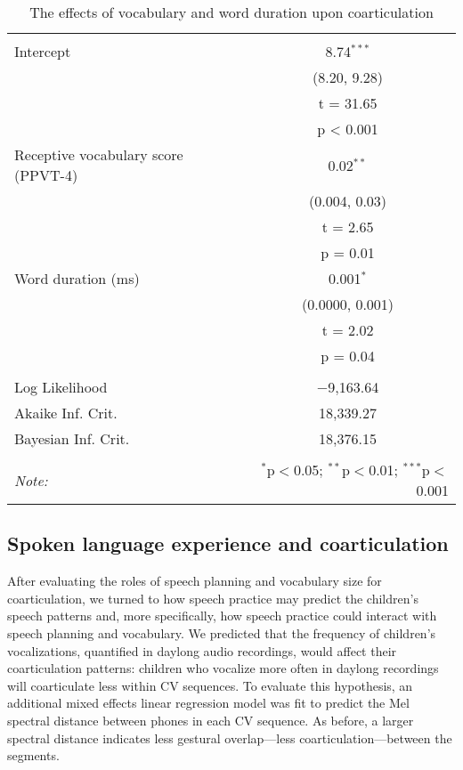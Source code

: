 \documentclass[a4paper,man,natbib,donotrepeattitle, apacite]{apa6}
\begin{document}
\begin{table}[!htbp] \centering 
  \caption{The effects of vocabulary and word duration upon coarticulation} 
  \label{tab:model-1} 
\begin{tabular}{@{\extracolsep{5pt}}lc} 
\\[-1.8ex]\hline 
\hline \\[-1.8ex] 
 Intercept & 8.74$^{***}$ \\ 
  & (8.20, 9.28) \\ 
  & t = 31.65 \\ 
  & p < 0.001 \\ 
  Receptive vocabulary score (PPVT-4) & 0.02$^{**}$ \\ 
  & (0.004, 0.03) \\ 
  & t = 2.65 \\ 
  & p = 0.01 \\ 
  Word duration (ms) & 0.001$^{*}$ \\ 
  & (0.0000, 0.001) \\ 
  & t = 2.02 \\ 
  & p = 0.04 \\ 
 \hline \\[-1.8ex] 
Log Likelihood & $-$9,163.64 \\ 
Akaike Inf. Crit. & 18,339.27 \\ 
Bayesian Inf. Crit. & 18,376.15 \\ 
\hline 
\hline \\[-1.8ex] 
\textit{Note:}  & \multicolumn{1}{r}{$^{*}$p$<$0.05; $^{**}$p$<$0.01; $^{***}$p$<$0.001} \\ 
\end{tabular} 
\end{table}


\subsection{Spoken language experience and coarticulation}

After evaluating the roles of speech planning and vocabulary size for coarticulation, we turned to how speech practice may predict the children’s speech patterns and, more specifically, how speech practice could interact with speech planning and vocabulary. We predicted that the frequency of children’s vocalizations, quantified in daylong audio recordings, would affect their coarticulation patterns: children who vocalize more often in daylong recordings will coarticulate less within CV sequences. To evaluate this hypothesis, an additional mixed effects linear regression model was fit to predict the Mel spectral distance between phones in each CV sequence. As before, a larger spectral distance indicates less gestural overlap---less coarticulation---between the segments.
\end{document}
